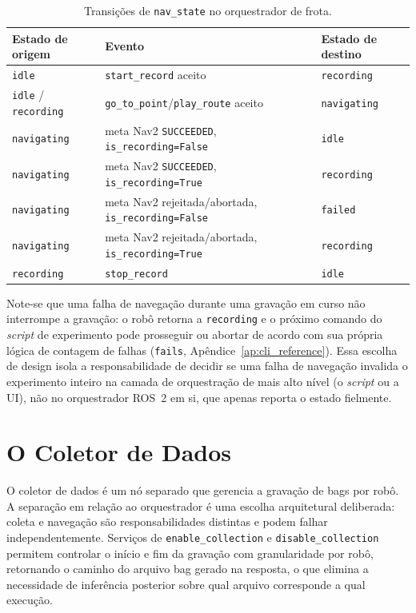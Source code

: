 \begin{table}[H]
\centering
\caption{Transições de \texttt{nav\_\allowbreak state} no orquestrador de frota.}
\label{tab:nav_state_transicoes}
\footnotesize
\begin{tabular}{lll}
\toprule
\textbf{Estado de origem} & \textbf{Evento} & \textbf{Estado de destino} \\
\midrule
\texttt{idle} & \texttt{start\_\allowbreak record} aceito & \texttt{recording} \\
\texttt{idle} / \texttt{recording} & \texttt{go\_\allowbreak to\_\allowbreak point}/\texttt{play\_\allowbreak route} aceito & \texttt{navigating} \\
\texttt{navigating} & meta Nav2 \texttt{SUCCEEDED}, \texttt{is\_\allowbreak recording=False} & \texttt{idle} \\
\texttt{navigating} & meta Nav2 \texttt{SUCCEEDED}, \texttt{is\_\allowbreak recording=True} & \texttt{recording} \\
\texttt{navigating} & meta Nav2 rejeitada/abortada, \texttt{is\_\allowbreak recording=False} & \texttt{failed} \\
\texttt{navigating} & meta Nav2 rejeitada/abortada, \texttt{is\_\allowbreak recording=True} & \texttt{recording} \\
\texttt{recording} & \texttt{stop\_\allowbreak record} & \texttt{idle} \\
\bottomrule
\end{tabular}
\end{table}

Note-se que uma falha de navegação durante uma gravação em curso não interrompe
a gravação: o robô retorna a \texttt{recording} e o próximo comando do
\textit{script} de experimento pode prosseguir ou abortar de acordo com sua
própria lógica de contagem de falhas (\texttt{fails}, Apêndice~\ref{ap:cli_reference}).
Essa escolha de design isola a responsabilidade de decidir se uma falha de
navegação invalida o experimento inteiro na camada de orquestração de mais alto
nível (o \textit{script} ou a UI), não no orquestrador ROS~2 em si, que apenas
reporta o estado fielmente.

\section{O Coletor de Dados}
\label{sec:coletor}

O coletor de dados é um nó separado que gerencia a gravação de bags por robô.
A separação em relação ao orquestrador é uma escolha arquitetural deliberada:
coleta e navegação são responsabilidades distintas e podem falhar independentemente.
Serviços de \texttt{enable\_\allowbreak collection} e \texttt{disable\_\allowbreak collection} permitem
controlar o início e fim da gravação com granularidade por robô, retornando o
caminho do arquivo bag gerado na resposta, o que elimina a necessidade de
inferência posterior sobre qual arquivo corresponde a qual execução.

